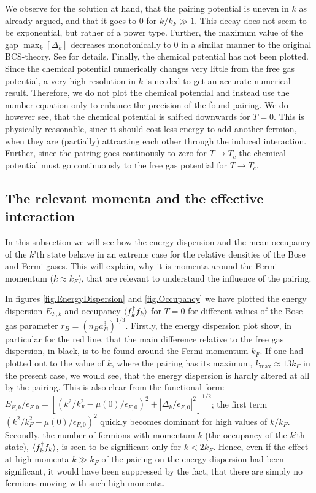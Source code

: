 We observe for the solution at hand, that the pairing potential is uneven in $k$ as already argued, and that it goes to 0 for $k/k_F \gg 1$. This decay does not seem to be exponential, but rather of a power type. Further, the maximum value of the gap $\max_k[\Delta_k]$ decreases monotonically to 0 in a similar manner to the original BCS-theory. See \cite{Tinkham,BruusFlensberg,PlischkeStatPhys} for details. Finally, the chemical potential has not been plotted. Since the chemical potential numerically changes very little from the free gas potential, a very high resolution in $k$ is needed to get an accurate numerical result. Therefore, we do not plot the chemical potential and instead use the number equation only to enhance the precision of the found pairing. We do however see, that the chemical potential is shifted downwards for $T = 0$. This is physically reasonable, since it should cost less energy to add another fermion, when they are (partially) attracting each other through the induced interaction. Further, since the pairing goes continously to zero for $T\to T_c$ the chemical potential must go continuously to the free gas potential for $T\to T_c$. 


\subsection{The relevant momenta and the effective interaction}
In this subsection we will see how the energy dispersion and the mean occupancy of the $k$'th state behave in an extreme case for the relative densities of the Bose and Fermi gases. This will explain, why it is momenta around the Fermi momentum ($k \approx k_F$), that are relevant to understand the influence of the pairing. 

In figures \ref{fig.EnergyDispersion} and \ref{fig.Occupancy} we have plotted the energy dispersion $E_{F,k}$ and occupancy $\braket{f_k^\dagger f_k}$ for $T = 0$ for different values of the Bose gas parameter $r_B = (n_Ba_B^3)^{1/3}$. Firstly, the energy dispersion plot show, in particular for the red line, that the main difference relative to the free gas dispersion, in black, is to be found around the Fermi momentum $k_F$. If one had plotted out to the value of $k$, where the pairing has its maximum, $k_{\max} \approx 13 k_F$ in the present case, we would see, that the energy dispersion is hardly altered at all by the pairing. This is also clear from the functional form: $E_{F,k}/\epsilon_{F,0} = [(k^2/k_F^2 - \mu(0)/\epsilon_{F,0})^2 + |\Delta_k/\epsilon_{F,0}|^2 ]^{1/2}$; the first term $(k^2/k_F^2 - \mu(0)/\epsilon_{F,0})^2$ quickly becomes dominant for high values of $k/k_F$. Secondly, the number of fermions with momentum $k$ (the occupancy of the $k$'th state), $\braket{f_k^\dagger f_k}$, is seen to be significant only for $k < 2k_F$. Hence, even if the effect at high momenta $k \gg k_F$ of the pairing on the energy dispersion had been significant, it would have been suppressed by the fact, that there are simply no fermions moving with such high momenta.

